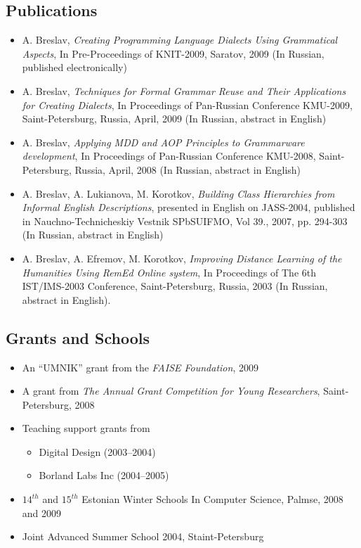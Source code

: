 \documentclass[a4paper, 12pt]{article}
\begin{document}
\subsection*{Publications}
\begin{itemize}
	\item A. Breslav, {\it Creating Programming Language Dialects Using Grammatical Aspects}, In Pre-Proceedings of KNIT-2009, Saratov, 2009 (In Russian, published electronically)
	\item A. Breslav, {\it Techniques for Formal Grammar Reuse and Their Applications for Creating Dialects}, In Proceedings of Pan-Russian Conference KMU-2009, Saint-Petersburg, Russia, April, 2009 (In Russian, abstract in English)
	\item A. Breslav, {\it Applying MDD and AOP Principles to Grammarware development}, In Proceedings of Pan-Russian Conference KMU-2008, Saint-Petersburg, Russia, April, 2008 (In Russian, abstract in English)
	\item A. Breslav, A. Lukianova, M. Korotkov, {\it Building Class Hierarchies from Informal English Descriptions}, presented in English on JASS-2004, published in Nauchno-Technicheskiy Vestnik SPbSUIFMO, Vol 39., 2007, pp. 294-303 (In Russian, abstract in English)
	\item A. Breslav, A. Efremov, M. Korotkov, {\it Improving Distance Learning of the Humanities Using {\it RemEd} Online system}, In Proceedings of The 6th IST/IMS-2003 Conference, Saint-Petersburg, Russia, 2003 (In Russian, abstract in English).
\end{itemize}

\subsection*{Grants and Schools}
\begin{itemize}
	\item An ``UMNIK'' grant from the {\it FAISE Foundation}, 2009
	\item A grant from {\it The Annual Grant Competition for Young Researchers}, Saint-Petersburg, 2008
	\item {Teaching support grants from 
		\begin{itemize}
			\item Digital Design (2003--2004)  
			\item Borland Labs Inc (2004--2005) 
		\end{itemize}}
	\item $14^{th}$ and $15^{th}$ Estonian Winter Schools In Computer Science, Palmse, 2008 and 2009
	\item Joint Advanced Summer School 2004, Staint-Petersburg
\end{itemize}
\end{document}
